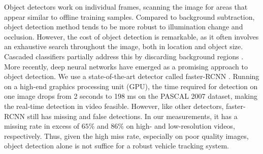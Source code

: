 Object detectors \cite{felzenszwalb2010cascade,girshick2014rich} %
work on individual frames, scanning the image for areas that appear similar to offline training samples. 
Compared to background subtraction, object detection method tends to be more robust to illumination change and occlusion.
However, the cost of object detection is remarkable, as it often involves an exhaustive search throughout the image, both in location and object size.
%
Cascaded classifiers partially address this by discarding background regions \cite{felzenszwalb2010cascade}.
More recently, deep neural networks \cite{girshick2014rich,renNIPS15fasterrcnn} have emerged as a promising approach to object detection. %
We use a state-of-the-art detector called faster-RCNN \cite{renNIPS15fasterrcnn}.
Running on a high-end graphics processing unit (GPU), the time required for detection on one image drops from 2 seconds \cite{felzenszwalb2010cascade} to 198 ms on the PASCAL 2007 dataset, making the real-time detection in video feasible. 
However, like other detectors, faster-RCNN still has missing and false detections. In our measurements, it has a missing rate in excess of $65\%$ and $86\%$ on high- and low-resolution videos, respectively.
Thus, given the high miss rate, especially on poor quality images, object detection alone is not suffice for a robust vehicle tracking system. 



